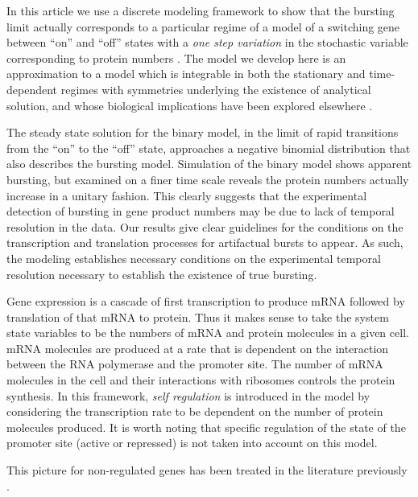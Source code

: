 In this article we use a discrete modeling framework to show that the
bursting limit actually corresponds to a particular regime of a model
of a switching gene between ``on'' and ``off'' states with a {\it one
  step variation} in the stochastic variable corresponding to protein
numbers \cite{Peccoud1995, sasai03, Hornos2005}.  The model we develop
here is an approximation to a model which is integrable in both the
stationary \cite{Hornos2005, innocentini07} and time-dependent regimes
\cite{Iyer-Biswas2009, ramos11} with symmetries underlying the
existence of analytical solution, and whose biological implications
have been explored elsewhere \cite{Ramos2007, ramos10}.


The steady state solution for the binary model, in the limit of rapid
transitions from the ``on'' to the ``off'' state, approaches a
negative binomial distribution that also describes the bursting model.
Simulation of the binary model shows apparent bursting, but examined
on a finer time scale reveals the protein numbers actually increase in
a unitary fashion.  This clearly suggests that the experimental
detection of bursting in gene product numbers may be due to lack of
temporal resolution in the data. Our results give clear guidelines for
the conditions on the transcription and translation processes for
artifactual bursts to appear.  As such, the modeling establishes
necessary conditions on the experimental temporal resolution necessary
to establish the existence of true bursting.

Gene expression is a cascade of first transcription to produce mRNA
followed by translation of that mRNA to protein.  Thus it makes sense
to take the system state variables to be the numbers of mRNA and
protein molecules in a given cell.  mRNA molecules are produced at a
rate that is dependent on the interaction between the RNA polymerase
and the promoter site. The number of mRNA molecules in the cell and
their interactions with ribosomes controls the protein synthesis.  In
this framework, {\it self regulation} is introduced in the model by
considering the transcription rate to be dependent on the number of
protein molecules produced.  It is worth noting that specific
regulation of the state of the promoter site (active or repressed) is
not taken into account on this model.

This picture for non-regulated genes has been treated
in the literature previously \cite{Thattai01}.

